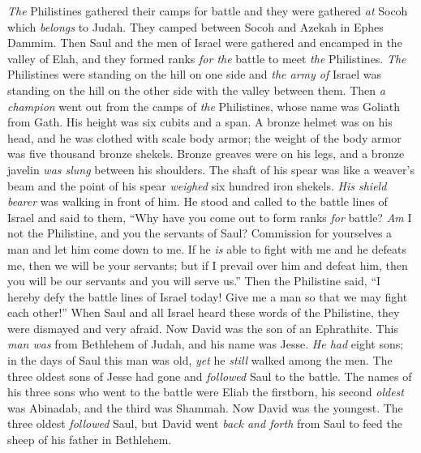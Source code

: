 \begin{biblechapter} %
 \textit{The} Philistines gathered their camps for battle and they were gathered \textit{at} Socoh which \textit{belongs} to Judah. They camped between Socoh and Azekah in Ephes Dammim.
\verse Then Saul and the men of Israel were gathered and encamped in the valley of Elah, and they formed ranks \textit{for the} battle to meet \textit{the} Philistines.
\verse \textit{The} Philistines were standing on the hill on one side and \textit{the army of} Israel was standing on the hill on the other side with the valley between them.
\verse Then \textit{a champion} went out from the camps of \textit{the} Philistines, whose name was Goliath from Gath. His height was six cubits and a span.
\verse A bronze helmet was on his head, and he was clothed with scale body armor; the weight of the body armor was five thousand bronze shekels.
\verse Bronze greaves were on his legs, and a bronze javelin \textit{was slung} between his shoulders.
\verse The shaft of his spear was like a weaver’s beam and the point of his spear \textit{weighed} six hundred iron shekels. \textit{His shield bearer} was walking in front of him.
\verse He stood and called to the battle lines of Israel and said to them, “Why have you come out to form ranks \textit{for} battle? \textit{Am} I not the Philistine, and you the servants of Saul? Commission for yourselves a man and let him come down to me.
\verse If he \textit{is} able to fight with me and he defeats me, then we will be your servants; but if I prevail over him and defeat him, then you will be our servants and you will serve us.”
\verse Then the Philistine said, “I hereby defy the battle lines of Israel today! Give me a man so that we may fight each other!”
\verse When Saul and all Israel heard these words of the Philistine, they were dismayed and very afraid.
 Now David was the son of an Ephrathite. This \textit{man was} from Bethlehem of Judah, and his name was Jesse. \textit{He had} eight sons; in the days of Saul this man was old, \textit{yet} he \textit{still} walked among the men.
\verse The three oldest sons of Jesse had gone and \textit{followed} Saul to the battle. The names of his three sons who went to the battle were Eliab the firstborn, his second \textit{oldest} was Abinadab, and the third was Shammah.
\verse Now David was the youngest. The three oldest \textit{followed} Saul,
\verse but David went \textit{back and forth} from Saul to feed the sheep of his father in Bethlehem.

\end{biblechapter}
